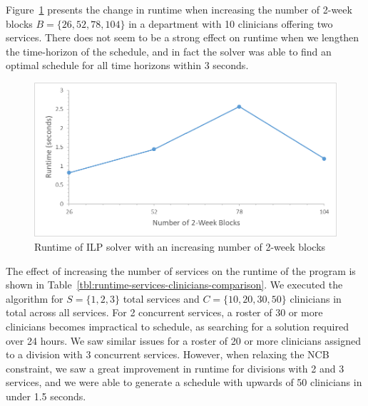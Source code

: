 Figure~\ref{fig:runtime-blocks} presents the change in runtime when increasing
the number of 2-week blocks $B = \{26, 52, 78, 104\}$ in a department with 10
clinicians offering two services. There does not seem to be a strong effect on
runtime when we lengthen the time-horizon of the schedule, and in fact the
solver was able to find an optimal schedule for all time horizons within 3
seconds. %

\begin{figure}[h]
	\centering
	\includegraphics[scale=.5]{fig/runtime_blocks}
	\caption{Runtime of ILP solver with an increasing number of 2-week blocks}%
  \label{fig:runtime-blocks}
\end{figure}

The effect of increasing the number of services %
on the runtime of the program is shown in Table~\ref{tbl:runtime-services-clinicians-comparison}. We executed the algorithm for
$S = \{1, 2, 3\}$ total services and $C = \{10, 20, 30, 50\}$ clinicians in
total across all services. For 2 concurrent services, a roster of 30 or more
clinicians becomes impractical to schedule, as searching for a solution required
over 24 hours. We saw similar issues for a roster of 20 or more clinicians
assigned to a division with 3 concurrent services. However, when relaxing the
NCB constraint, we saw a great improvement in runtime for divisions with 2 and 3
services, and we were able to generate a schedule with upwards of 50 clinicians
in under 1.5 seconds.  %


